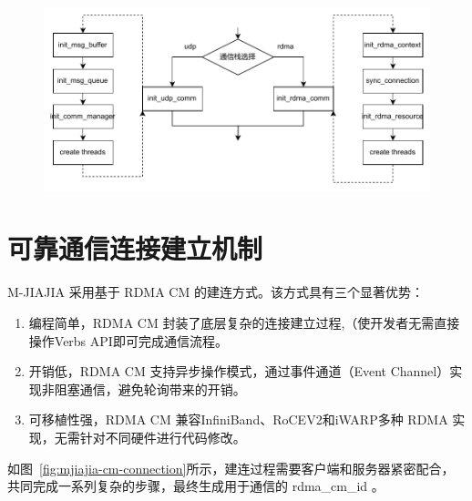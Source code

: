 {    \begin{figure}[!htbp]
        \centering
        \includegraphics[width=\textwidth]{Img/MJIAJIA通信栈.drawio.pdf}
        \label{fig:mjiajia-rdma-modules}
    \end{figure}

    \section{可靠通信连接建立机制}
    M-JIAJIA 采用基于 RDMA CM 的建连方式。该方式具有三个显著优势：
    \begin{enumerate}[label=\arabic*.]
        \item 编程简单，RDMA CM 封装了底层复杂的连接建立过程,（使开发者无需直接操作Verbs API即可完成通信流程。
        \item 开销低，RDMA CM 支持异步操作模式，通过事件通道（Event Channel）实现非阻塞通信，避免轮询带来的开销。
        \item 可移植性强，RDMA CM 兼容InfiniBand、RoCEV2和iWARP多种 RDMA 实现，无需针对不同硬件进行代码修改。
    \end{enumerate}

    如图~\ref{fig:mjiajia-cm-connection}所示，建连过程需要客户端和服务器紧密配合，共同完成一系列复杂的步骤，最终生成用于通信的 rdma\_cm\_id 。

}
